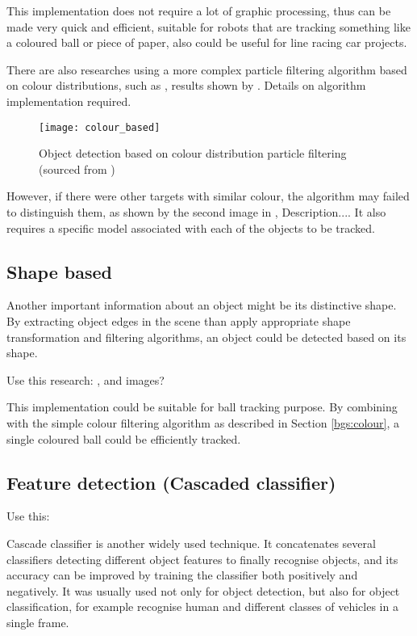 This implementation does not require a lot of graphic processing, thus can be made very quick and efficient, suitable for robots that are tracking something like a coloured ball or piece of paper, also could be useful for line racing car projects.

There are also researches using a more complex particle filtering algorithm based on colour distributions, such as \cite{nummiaro2003color}, results shown by . {\color{red}Details on algorithm implementation required.}

\begin{figure}[H]
  \centering
  \texttt{[image: colour\_based]}
  \caption{Object detection based on colour distribution particle filtering (sourced from \cite{nummiaro2003color})}
  \label{Figure:nummiaro2003color}
\end{figure}

However, if there were other targets with similar colour, the algorithm may failed to distinguish them, as shown by the second image in , {\color{red}Description...}. It also requires a specific model associated with each of the objects to be tracked.

\subsection{Shape based}

Another important information about an object might be its distinctive shape. By extracting object edges in the scene than apply appropriate shape transformation and filtering algorithms, an object could be detected based on its shape.

{\color{red}Use this research: \cite{borovicka2003circle}, and images?}

This implementation could be suitable for ball tracking purpose. By combining with the simple colour filtering algorithm as described in Section \ref{bgs:colour}, a single coloured ball could be efficiently tracked.

\subsection{Feature detection (Cascaded classifier)}

{\color{red}Use this: \cite{viola2001rapid}}

Cascade classifier \cite{cascade} is another widely used technique. It concatenates several classifiers detecting different object features to finally recognise objects, and its accuracy can be improved by training the classifier both positively and negatively. It was usually used not only for object detection, but also for object classification, for example recognise human and different classes of vehicles in a single frame.

